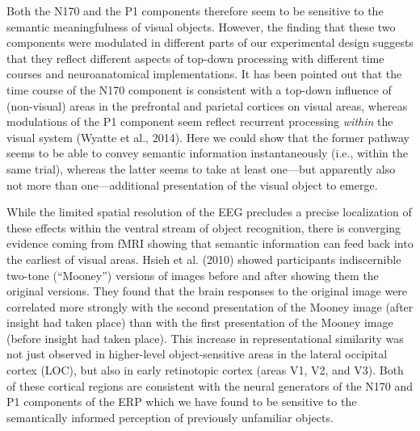 \documentclass[
  english,
  doc,12pt,twoside,floatsintext]{apa7}
\begin{document}
Both the N170 and the P1 components therefore seem to be sensitive to the semantic meaningfulness of visual objects. However, the finding that these two components were modulated in different parts of our experimental design suggests that they reflect different aspects of top-down processing with different time courses and neuroanatomical implementations. It has been pointed out that the time course of the N170 component is consistent with a top-down influence of (non-visual) areas in the prefrontal and parietal cortices on visual areas, whereas modulations of the P1 component seem reflect recurrent processing \emph{within} the visual system (Wyatte et al., 2014). Here we could show that the former pathway seems to be able to convey semantic information instantaneously (i.e., within the same trial), whereas the latter seems to take at least one---but apparently also not more than one---additional presentation of the visual object to emerge.

While the limited spatial resolution of the EEG precludes a precise localization of these effects within the ventral stream of object recognition, there is converging evidence coming from fMRI showing that semantic information can feed back into the earliest of visual areas. Hsieh et al. (2010) showed participants indiscernible two-tone (``Mooney'') versions of images before and after showing them the original versions. They found that the brain responses to the original image were correlated more strongly with the second presentation of the Mooney image (after insight had taken place) than with the first presentation of the Mooney image (before insight had taken place). This increase in representational similarity was not just observed in higher-level object-sensitive areas in the lateral occipital cortex (LOC), but also in early retinotopic cortex (areas V1, V2, and V3). Both of these cortical regions are consistent with the neural generators of the N170 and P1 components of the ERP which we have found to be sensitive to the semantically informed perception of previously unfamiliar objects.
\end{document}
